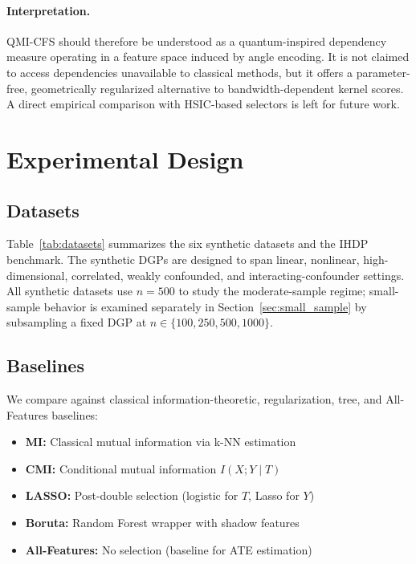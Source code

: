 \documentclass{svproc}
\begin{document}
\paragraph{Interpretation.} QMI-CFS should therefore be understood as a quantum-inspired dependency measure operating in a feature space induced by angle encoding. It is not claimed to access dependencies unavailable to classical methods, but it offers a parameter-free, geometrically regularized alternative to bandwidth-dependent kernel scores. A direct empirical comparison with HSIC-based selectors is left for future work.

\section{Experimental Design}
\label{sec:experiments}

\subsection{Datasets}

Table~\ref{tab:datasets} summarizes the six synthetic datasets and the IHDP benchmark. The synthetic DGPs are designed to span linear, nonlinear, high-dimensional, correlated, weakly confounded, and interacting-confounder settings. All synthetic datasets use $n=500$ to study the moderate-sample regime; small-sample behavior is examined separately in Section~\ref{sec:small_sample} by subsampling a fixed DGP at $n \in \{100, 250, 500, 1000\}$.



\subsection{Baselines}

We compare against classical information-theoretic, regularization, tree, and All-Features baselines:
\begin{itemize}
    \item \textbf{MI:} Classical mutual information via k-NN estimation
    \item \textbf{CMI:} Conditional mutual information $I(X; Y \mid T)$
    \item \textbf{LASSO:} Post-double selection (logistic for $T$, Lasso for $Y$)
    \item \textbf{Boruta:} Random Forest wrapper with shadow features
    \item \textbf{All-Features:} No selection (baseline for ATE estimation)
\end{itemize}
\end{document}
